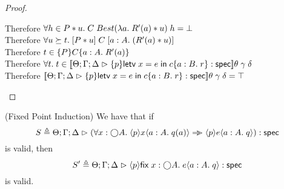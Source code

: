 \begin{proof}
\begin{tabbedproof}
    \oooooo Therefore $\forall h \in P * u.\; C\;Best(\lambda a.\;R'(a) * u)\;h = \bot$\\
    \ooooo Therefore $\forall u \succeq t.\; [{P * u}]\;{C}\;[{a:A}.\;{(R'(a) * u)}]$ \\
    \ooooo Therefore $t \in \{{P}\}{C}\{{a:A}.\;{R'(a)}\}$ \\
    \oooo Therefore $\forall t.\; t \in [\![{{\Theta; \Gamma; \Delta} \vartriangleright {\{{p}\}{\mathsf{letv}\;x = e\;\mathsf{in}\;c}\{{a:B}.\;{r}\}} : \mathsf{spec}}]\!]\theta\;\gamma\;\delta$ \\
    \oooo Therefore $[\![{{\Theta; \Gamma; \Delta} \vartriangleright {\{{p}\}{\mathsf{letv}\;x = e\;\mathsf{in}\;c}\{{a:B}.\;{r}\}} : \mathsf{spec}}]\!]\theta\;\gamma\;\delta = \top$\\
  \end{tabbedproof}
\end{proof}

\begin{lemma}{(Fixed Point Induction)}
We have that if 
\begin{displaymath}
   S \triangleq 
   {\Theta; \Gamma; \Delta} \vartriangleright {(\forall x:\bigcirc{A}.\; \langle{p}\rangle{x}\langle{a:A}.\;{q(a)}\rangle \Rightarrow\!\!\!>\langle{p}\rangle{e}\langle{a:A}.\;{q}\rangle)} : \mathsf{spec}
\end{displaymath}
\noindent is valid, then 
\begin{displaymath}
  S' \triangleq {\Theta; \Gamma; \Delta} \vartriangleright {\langle{p}\rangle{\mathsf{fix}\;{x:\bigcirc{A}}.\;{e}}\langle{a:A}.\;{q}\rangle} : \mathsf{spec}
\end{displaymath}
is valid.
\end{lemma}

